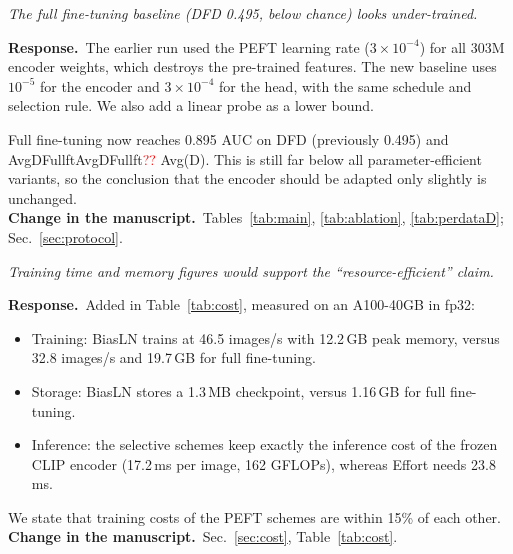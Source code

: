 \documentclass[11pt]{article}
\newcommand{\num}[1]{\ifcsname #1\endcsname\csname #1\endcsname\else\textcolor{red}{??}\fi}
\newenvironment{comment}{\par\medskip\noindent\begin{minipage}{\linewidth}\color{black!70}\itshape}{\end{minipage}\par\smallskip}
\newcommand{\resp}{\noindent\textbf{Response.}~}
\newcommand{\change}{\noindent\textbf{Change in the manuscript.}~}
\begin{document}
\begin{comment}
The full fine-tuning baseline (DFD 0.495, below chance) looks under-trained.
\end{comment}
\resp The earlier run used the PEFT learning rate ($3\times10^{-4}$) for all 303M encoder weights, which destroys the pre-trained features. The new baseline uses $10^{-5}$ for the encoder and $3\times10^{-4}$ for the head, with the same schedule and selection rule. We also add a linear probe as a lower bound.

Full fine-tuning now reaches 0.895 AUC on DFD (previously 0.495) and \num{AvgDFullft} Avg(D). This is still far below all parameter-efficient variants, so the conclusion that the encoder should be adapted only slightly is unchanged.\\
\change Tables~\ref{tab:main}, \ref{tab:ablation}, \ref{tab:perdataD}; Sec.~\ref{sec:protocol}.

\begin{comment}
Training time and memory figures would support the ``resource-efficient'' claim.
\end{comment}
\resp Added in Table~\ref{tab:cost}, measured on an A100-40GB in fp32:
\begin{itemize}
\item Training: BiasLN trains at 46.5 images/s with 12.2\,GB peak memory, versus 32.8 images/s and 19.7\,GB for full fine-tuning.
\item Storage: BiasLN stores a 1.3\,MB checkpoint, versus 1.16\,GB for full fine-tuning.
\item Inference: the selective schemes keep exactly the inference cost of the frozen CLIP encoder (17.2\,ms per image, 162 GFLOPs), whereas Effort needs 23.8\,ms.
\end{itemize}
We state that training costs of the PEFT schemes are within 15\% of each other.\\
\change Sec.~\ref{sec:cost}, Table~\ref{tab:cost}.
\end{document}
